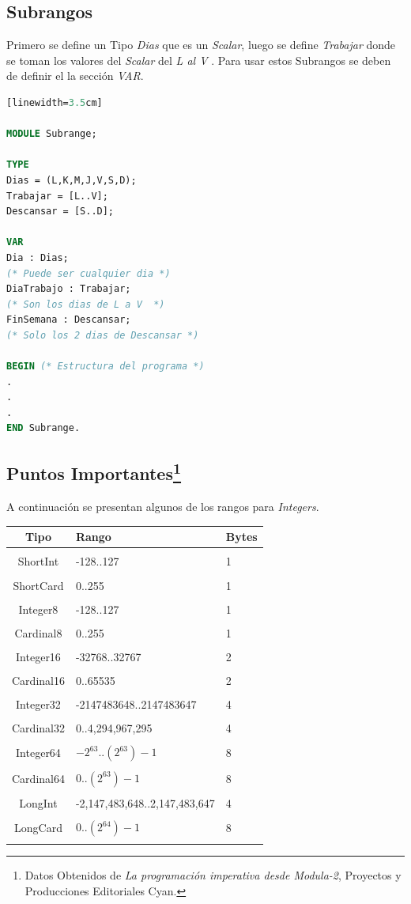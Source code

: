 \documentclass[10pt,journal,compsoc]{IEEEtran}
\begin{document}
\subsection{Subrangos}
Primero se define un Tipo \emph{Dias} que es un \emph{Scalar}, luego se define \emph{Trabajar} donde se toman los valores del \emph{Scalar} del \emph{L al V} . Para usar estos Subrangos se deben de definir el la secci\'on \emph{VAR}.

\begin{lstlisting}[language=Modula-2, caption = {Ejemplo de subrangos}][linewidth=3.5cm]

MODULE Subrange;

TYPE 
Dias = (L,K,M,J,V,S,D);
Trabajar = [L..V];
Descansar = [S..D];

VAR  
Dia : Dias;  
(* Puede ser cualquier dia *)
DiaTrabajo : Trabajar;
(* Son los dias de L a V  *)
FinSemana : Descansar;
(* Solo los 2 dias de Descansar *)

BEGIN (* Estructura del programa *)
.
.
.
END Subrange.
\end{lstlisting}

\subsection{Puntos Importantes\protect\footnote{Datos Obtenidos de \emph{La programación imperativa desde Modula-2}, Proyectos y Producciones Editoriales Cyan.}}

A continuaci\'on se presentan algunos de los rangos para \emph{Integers}.
\begin{tabular}{c p{5cm} p{1cm}}
	Tipo & Rango & Bytes\\
	\hline\\
	ShortInt & -128..127 & 1\\
	\hline\\
	ShortCard & 0..255 & 1\\
	\hline\\
	Integer8 & -128..127 & 1\\
	\hline\\
	Cardinal8 & 0..255 & 1\\
	\hline\\
	Integer16 & -32768..32767 & 2\\
	\hline\\
	Cardinal16 & 0..65535 & 2\\
	\hline\\
	Integer32 & -2147483648..2147483647 & 4\\
	\hline\\
	Cardinal32 & 0..4,294,967,295 & 4\\
	\hline\\
	Integer64 & $-2^{63}$..$(2^{63})-1$ & 8\\
	\hline\\
	Cardinal64 & $0$..$(2^{63})-1$ & 8\\
	\hline\\
	LongInt & -2,147,483,648..2,147,483,647 & 4\\
	\hline\\
	LongCard & $0$..$(2^{64})-1$ & 8\\
	\hline\\
\end{tabular}
\end{document}
